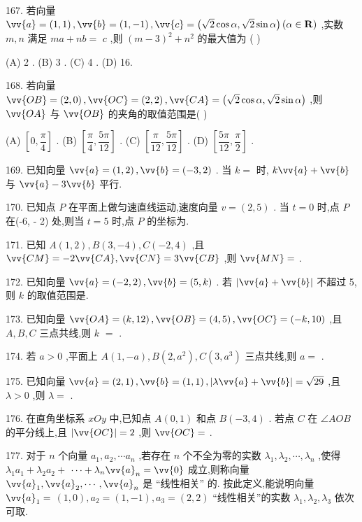 167. 若向量 $\vv{a} = \left( {1,1}\right) ,\vv{b} = \left( {1, - 1}\right) ,\vv{c} = \left( {\sqrt{2}\cos \alpha ,\sqrt{2}\sin \alpha }\right) \left( {\alpha  \in  \mathbf{R}}\right)$ ,实数 $m,n$ 满足 ${ma} + {nb} =$  $c$ ,则 ${\left( m - 3\right) }^{2} + {n}^{2}$ 的最大值为 (   )

(A) 2 . (B) 3 . (C) 4 . (D) 16.

168. 若向量 $\vv{OB} = \left( {2,0}\right) ,\vv{OC} = \left( {2,2}\right) ,\vv{CA} = \left( {\sqrt{2}\cos \alpha ,\sqrt{2}\sin \alpha }\right)$ ,则 $\vv{OA}$ 与 $\vv{OB}$ 的夹角的取值范围是(   )

(A) $\left\lbrack  {0,\dfrac{\pi }{4}}\right\rbrack$ . (B) $\left\lbrack  {\dfrac{\pi }{4},\dfrac{5\pi }{12}}\right\rbrack$ . (C) $\left\lbrack  {\dfrac{\pi }{12},\dfrac{5\pi }{12}}\right\rbrack$ . (D) $\left\lbrack  {\dfrac{5\pi }{12},\dfrac{\pi }{2}}\right\rbrack$ .

169. 已知向量 $\vv{a} = \left( {1,2}\right) ,\vv{b} = \left( {-3,2}\right)$ . 当 $k =$ \blkda{}时, $k\vv{a} + \vv{b}$ 与 $\vv{a} - 3\vv{b}$ 平行.

170. 已知点 $P$ 在平面上做匀速直线运动,速度向量 $v = \left( {2,5}\right)$ . 当 $t = 0$ 时,点 $P$ 在(-6, - 2) 处,则当 $t = 5$ 时,点 $P$ 的坐标为\blkda{}.

171. 已知 $A\left( {1,2}\right) ,B\left( {3, - 4}\right) ,C\left( {-2,4}\right)$ ,且 $\vv{CM} =  - 2\vv{CA},\vv{CN} = 3\vv{CB}$ ,则 $\vv{MN} =$ \blkda{}.

172. 已知向量 $\vv{a} = \left( {-2,2}\right) ,\vv{b} = \left( {5,k}\right)$ . 若 $\left| {\vv{a} + \vv{b}}\right|$ 不超过 5,则 $k$ 的取值范围是\blkda{}.

173. 已知向量 $\vv{OA} = \left( {k,{12}}\right) ,\vv{OB} = \left( {4,5}\right) ,\vv{OC} = \left( {-k,{10}}\right)$ ,且 $A,B,C$ 三点共线,则 $k$  $=$ \blkda{}.

174. 若 $a > 0$ ,平面上 $A\left( {1, - a}\right) ,B\left( {2,{a}^{2}}\right) ,C\left( {3,{a}^{3}}\right)$ 三点共线,则 $a =$ \blkda{}.

175. 已知向量 $\vv{a} = \left( {2,1}\right) ,\vv{b} = \left( {1,1}\right) ,\left| {\lambda \vv{a} + \vv{b}}\right|  = \sqrt{29}$ ,且 $\lambda  > 0$ ,则 $\lambda  =$ \blkda{}.

176. 在直角坐标系 ${xOy}$ 中,已知点 $A\left( {0,1}\right)$ 和点 $B\left( {-3,4}\right)$ . 若点 $C$ 在 $\angle {AOB}$ 的平分线上,且 $\left| \vv{OC}\right|  = 2$ ,则 $\vv{OC} =$ \blkda{}.

177. 对于 $n$ 个向量 ${a}_{1},{a}_{2},\cdots {a}_{n}$ ,若存在 $n$ 个不全为零的实数 ${\lambda }_{1},{\lambda }_{2},\cdots ,{\lambda }_{n}$ ,使得 ${\lambda }_{1}{a}_{1} + {\lambda }_{2}{a}_{2} +$  $\cdots  + {\lambda }_{n}{\vv{a}}_{n} = \vv{0}$ 成立,则称向量 ${\vv{a}}_{1},{\vv{a}}_{2},\cdots ,{\vv{a}}_{n}$ 是 “线性相关” 的. 按此定义,能说明向量 ${\vv{a}}_{1} =$  $\left( {1,0}\right) ,{a}_{2} = \left( {1, - 1}\right) ,{a}_{3} = \left( {2,2}\right)$ “线性相关”的实数 ${\lambda }_{1},{\lambda }_{2},{\lambda }_{3}$ 依次可取\blkda{}.

